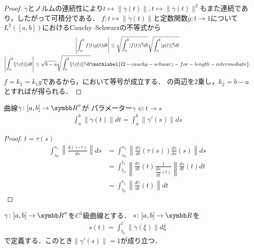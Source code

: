 \documentclass{ltjsbook}
\begin{document}
\begin{proof} \(\dot{\gamma}\)とノルムの連続性により\(t \mapsto \lVert \dot{\gamma}(t) \rVert, t \mapsto \lVert \dot{\gamma}(t) \rVert^2\)もまた連続であり，したがって可積分である．
\(f\colon t \mapsto \lVert \dot{\gamma}(t) \rVert\)と定数関数\(g \colon t \to 1\)について\(L^2([a, b])\)におけるCauchy--Schwarzの不等式から
\begin{gather}
    \left\lvert \int_a^b f(t) g(t) dt \right\rvert \leq \sqrt{\int_a^b \lvert f(t) \rvert^2 dt} \sqrt{\int_a^b \lvert g(t) \rvert^2 dt} \notag \\
    \left\lvert \int_a^b \lVert \dot{\gamma}(t) \rVert dt \right\rvert \leq \sqrt{b - a} \sqrt{\int_a^b \lVert \dot{\gamma}(t) \rVert^2 dt} \mathlabel{l2-cauchy-schwarz-for-length-intermediate}.
\end{gather}
\(f = k_1 = k_1 g\)であるから，において等号が成立する．
の両辺を\(2\)乗し，\(k_2 = b - a\)とすればが得られる．
\end{proof}

\begin{thmbox}
\begin{proposition}
曲線\(\gamma\colon [a, b] \to {\Real}^n\)が
パラメーター\(\gamma\)
\(\psi\colon t \to s\)
\begin{align*}
    \int_a^b \lVert \dot{\gamma}(t) \rVert dt
    = \int_a^b \lVert \gamma'(s) \rVert ds
\end{align*}
\end{proposition}
\end{thmbox}

\begin{proof}
\(t = \tau(s)\)
\begin{align*}
    \int_{s_0}^{s_1} \left\lVert \frac{d(\gamma \circ \tau)}{ds}\right\rVert ds
    &= \int_{s_0}^{s_1} \left\lVert \frac{d\gamma}{dt}(\tau(s)) \frac{d\tau}{ds}(s) \right\rVert ds \\
    &= \int_{t_0}^{t_1} \left\lVert \frac{d\gamma}{dt}(t) \frac{1}{\dfrac{ds}{dt}(t)} \right\rVert \frac{ds}{dt}(t) dt \\
    &= \int_{t_0}^{t_1} \left\lVert \frac{d\gamma}{dt}(t) \right\rVert dt
\end{align*}
\end{proof}

\begin{thmbox}
\begin{proposition}
\(\gamma \colon [a, b] \to {\Real}^n\)を\(C^1\)級曲線とする．
\(s\colon [a, b] \to {\Real}\)を
\begin{align*}
    s(t) = \int_{t_0}^t \left\lVert \dot{\gamma}(\xi) \right\rVert d\xi
\end{align*}
で定義する．このとき\(\lVert \gamma' (s) \rVert = 1\)が成り立つ．
\end{proposition}
\end{thmbox}
\end{document}
